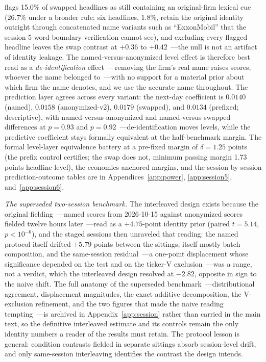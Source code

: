 flags 15.0\% of swapped headlines as still containing an original-firm lexical cue (26.7\% under a broader rule; six headlines, 1.8\%, retain the original identity outright through concatenated name variants such as ``ExxonMobil'' that the session-5 word-boundary verification cannot see), and excluding every flagged headline leaves the swap contrast at $+0.36$ to $+0.42$~---the null is not an artifact of identity leakage. The named-versus-anonymized level effect is therefore best read as a \emph{de-identification} effect~---removing the firm's real name raises scores, whoever the name belonged to~---with no support for a material prior about which firm the name denotes, and we use the accurate name throughout. The prediction layer agrees across every variant: the next-day coefficient is $0.0140$ (named), $0.0158$ (anonymized-v2), $0.0179$ (swapped), and $0.0134$ (prefixed; descriptive), with named-versus-anonymized and named-versus-swapped differences at $p=0.93$ and $p=0.92$~---de-identification moves levels, while the predictive coefficient stays formally equivalent at the half-benchmark margin. The formal level-layer equivalence battery at a pre-fixed margin of $\delta=1.25$ points (the prefix control certifies; the swap does not, minimum passing margin 1.73 points headline-level), the economics-anchored margins, and the session-by-session prediction-outcome tables are in Appendices~\ref{app:power}, \ref{app:session5}, and~\ref{app:session6}.


\emph{The superseded two-session benchmark.} The interleaved design exists because the original fielding~---named scores from 2026-10-15 against anonymized scores fielded twelve hours later~---read as a $+4.75$-point identity prior (paired $t=5.14$, $p<10^{-6}$), and the staged sessions then unraveled that reading: the named protocol itself drifted $+5.79$ points between the sittings, itself mostly batch composition, and the same-session residual~---a one-point displacement whose significance depended on the test and on the ticker-V exclusion~---was a range, not a verdict, which the interleaved design resolved at $-2.82$, opposite in sign to the naive shift. The full anatomy of the superseded benchmark~---distributional agreement, displacement magnitudes, the exact additive decomposition, the V-exclusion refinement, and the two figures that made the naive reading tempting~---is archived in Appendix~\ref{app:session} rather than carried in the main text, so the definitive interleaved estimate and its controls remain the only identity numbers a reader of the results must retain. The protocol lesson is general: condition contrasts fielded in separate sittings absorb session-level drift, and only same-session interleaving identifies the contrast the design intends.

